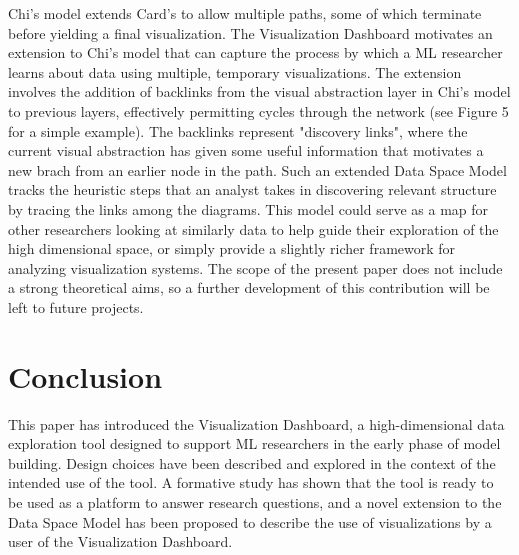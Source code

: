 \documentclass{sigchi}
\begin{document}
%
Chi's model extends Card's to allow multiple paths, some of which terminate before yielding a final visualization. %
%
The Visualization Dashboard motivates an extension to Chi's model that can capture the process by which a ML researcher learns about data using multiple, temporary visualizations. %
%
The extension involves the addition of backlinks from the visual abstraction layer in Chi's model to previous layers, effectively permitting cycles through the network (see Figure 5 for a simple example). %
%
The backlinks represent "discovery links", where the current visual abstraction has given some useful information that motivates a new brach from an earlier node in the path.
%
Such an extended Data Space Model tracks the heuristic steps that an analyst takes in discovering relevant structure by tracing the links among the diagrams. %
%
This model could serve as a map for other researchers looking at similarly data to help guide their exploration of the high dimensional space, or simply provide a slightly richer framework for analyzing visualization systems. %
%
The scope of the present paper does not include a strong theoretical aims, so a further development of this contribution will be left to future projects. %
%
\section{Conclusion}%
This paper has introduced the Visualization Dashboard, a high-dimensional data exploration tool designed to support ML researchers in the early phase of model building. Design choices have been described and explored in the context of the intended use of the tool. A formative study has shown that the tool is ready to be used as a platform to answer research questions, and a novel extension to the Data Space Model has been proposed to describe the use of visualizations by a user of the Visualization Dashboard.
%



\end{document}
